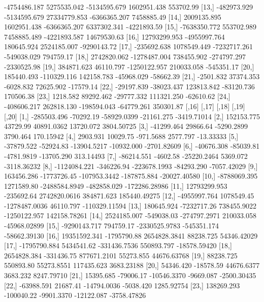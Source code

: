 \documentclass[a4paper, 12pt]{article}
\begin{document}
\begin{Schunk}
\begin{Soutput}
[12,]  -4754486.187  5275535.042 -5134595.679  1602951.438   553702.99
[13,]   -482973.929 -5134595.679 27334779.853 -6366365.207  7458885.49
[14,]   2009135.895  1602951.438 -6366365.207  6337302.341 -4221893.59
[15,]  -7638350.772   553702.989  7458885.489 -4221893.587 14679530.63
[16,]  12793299.953 -4955997.764   180645.924  2524185.007 -9290143.72
[17,]   -235692.638  1078549.449 -7232717.261  -549038.029   794759.17
[18,]   2742820.062 -1278487.004   738455.902  -274797.297 -2330525.98
[19,]    384871.623    46110.797 -1250122.957   210033.058  -545351.17
[20,]    185440.493  -110329.116   142158.783   -45968.029   -58662.39
[21,]     -2501.832    37374.353    -6028.832    72625.902   -17579.14
[22,]    -29197.839   -38023.437   123813.842   -83120.736   170506.38
[23,]      1218.582    89292.462   -29777.332   111321.250   -62610.62
[24,]   -408606.217   262818.130  -198594.043   -64779.261   350301.87
             [,16]       [,17]         [,18]        [,19]         [,20]
 [1,]  -285503.496   -70292.19   -58929.0399   -21161.275   -3419.71014
 [2,]   152153.775    43729.99    40891.0362    13720.072    3804.50725
 [3,]   -41299.464    29866.64    -5290.2899     3790.464     170.15942
 [4,]     2903.931    10029.75     -971.5688     2577.797     -13.33333
 [5,]   -37879.522   -52924.83   -13904.5217   -10932.000   -2701.82609
 [6,]   -40676.308   -85039.81    -4781.9819   -13705.290     313.14493
 [7,]   -86214.551    -4602.58   -25220.2464     5369.072   -3118.36232
 [8,] -1124084.221  -346226.94  -223678.1993   -84293.290   -7057.42029
 [9,]   163456.286 -1773726.45  -107953.3442  -187875.884  -20027.40580
[10,] -8788069.395  1271589.80 -2488584.8949  -482858.029 -172286.28986
[11,] 12793299.953  -235692.64  2742820.0616   384871.623  185440.49275
[12,] -4955997.764  1078549.45 -1278487.0036    46110.797 -110329.11594
[13,]   180645.924 -7232717.26   738455.9022 -1250122.957  142158.78261
[14,]  2524185.007  -549038.03  -274797.2971   210033.058  -45968.02899
[15,] -9290143.717   794759.17 -2330525.9783  -545351.174  -58662.39130
[16,] 19351592.341 -1795790.88  2654828.3841    88238.725   54346.42029
[17,] -1795790.884  5434541.62  -331436.7536   550893.797  -18578.59420
[18,]  2654828.384  -331436.75   877671.2101    55273.855   44676.63768
[19,]    88238.725   550893.80    55273.8551   117435.623    3683.23188
[20,]    54346.420   -18578.59    44676.6377     3683.232    8247.79710
[21,]    15395.685   -79006.17   -10546.3370    -9669.087   -2500.30435
[22,]   -63988.591    21687.41   -14794.0036    -5038.420    1285.92754
[23,]   138269.293  -100040.22    -9901.3370   -12122.087   -3758.47826

\end{Soutput}
\end{Schunk}
\end{document}
